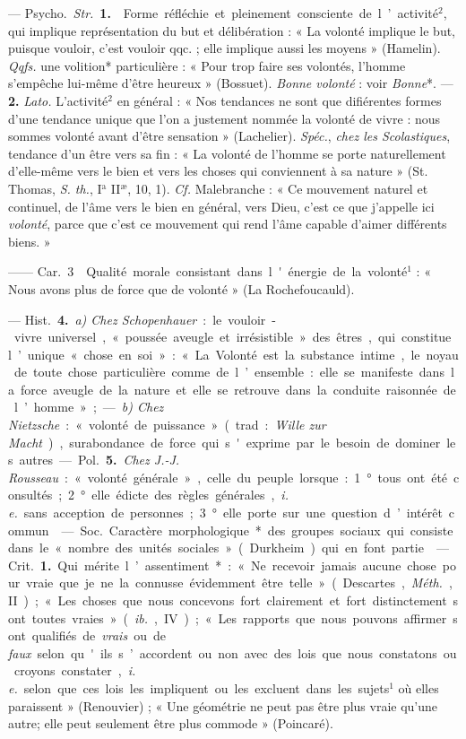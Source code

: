 \begin{itemize}[leftmargin=1cm, label=, itemsep=1pt]
 — \si{Psycho.} {\it Str.} {\bf 1.}  Forme
réfléchie et pleinement consciente de l’activité$^2$, qui implique
représentation du but et délibération : « La volonté implique le but, puisque
vouloir, c’est vouloir qqc. ; elle implique aussi les moyens » (Hamelin).
{\it Qqfs.}  une volition* particulière : « Pour trop faire
ses volontés, l’homme s’empêche lui-même d’être heureux » (Bossuet). {\it
Bonne volonté} : voir {\it Bonne}*. —  {\bf 2.}  {\it Lato.}
L'activité$^2$ en général : « Nos tendances ne sont que difiérentes formes
d’une tendance unique que l’on a justement nommée la volonté de vivre : nous
sommes volonté avant d'être sensation » (Lachelier). {\it Spéc.}, {\it chez
les Scolastiques}, tendance d’un être vers sa fin : « La volonté de l’homme
se porte naturellement d'elle-même vers le bien et vers les choses qui
conviennent à sa nature » (St. Thomas, {\it S. th.}, I$^\text{a}$
II$^\text{æ}$, 10, 1). {\it Cf.} Malebranche : « Ce mouvement naturel et
continuel, de l'âme vers le bien en général, vers Dieu, c’est ce que
j'appelle ici {\it volonté}, parce que c’est ce mouvement qui rend l'âme
capable d'aimer différents biens. »

—— \si{Car.} 3  Qualité morale consistant dans l'énergie de la
volonté$^1$ : « Nous avons plus de force que de volonté » (La Rochefoucauld).

— \si{Hist.}  {\bf 4.} {\it a) Chez Schopenhauer} : le vouloir-vivre
universel, « poussée aveugle et irrésistible » des êtres, qui constitue
l’unique « chose en soi » : « La Volonté est la substance intime, le noyau de
toute chose particulière comme de l’ensemble : elle se manifeste dans la
force aveugle de la
nature et elle se retrouve dans la conduite raisonnée de l’homme » ; —
{\it b) Chez Nietzsche} : « volonté de puissance » (trad. : {\it Wille zur
Macht}), surabondance de force qui s'exprime par le besoin de dominer les
autres.

— \si{Pol.}  {\bf 5.} {\it Chez J.-J. Rousseau} : « volonté générale », celle
du peuple lorsque : 1° tous ont été consultés; 2° elle édicte des règles
générales, {\it i. e.} sans acception de personnes; 3° elle porte sur une
question d’intérêt commun.

 — \si{Soc.} Caractère morphologique* des groupes sociaux
qui consiste dans le « nombre des unités sociales » (Durkheim) qui en font
partie.

 — \si{Crit.} {\bf 1.} Qui mérite l’assentiment* : « Ne recevoir
jamais aucune chose pour vraie que je ne la connusse évidemment être telle
» (Descartes, {\it Méth.}, II) ; « Les choses que nous concevons fort
clairement et fort distinctement sont toutes vraies » ({\it ib.}, IV) ; « Les
rapports que nous pouvons affirmer sont qualifiés de {\it vrais} ou de {\it
faux} selon qu'ils s’accordent ou non avec des lois que nous constatons ou
croyons constater, {\it i. e.} selon que ces lois les impliquent ou les
excluent dans les sujets$^1$ où elles paraissent » (Renouvier) ; « Une
géométrie ne peut pas être plus vraie qu’une autre; elle peut seulement être
plus commode » (Poincaré).


\end{itemize}
